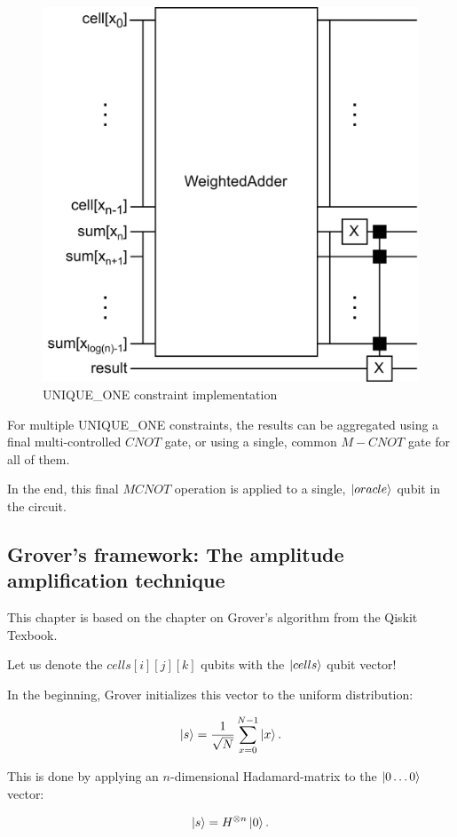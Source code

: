 \begin{figure}[H]
  \centering
    \includegraphics[width=0.7\linewidth]{content/assets/03_grovers_algorithm/unique_one.png}
    \caption{UNIQUE\_ONE constraint implementation}
\end{figure}

For multiple UNIQUE\_ONE constraints, the results can be aggregated using a final multi-controlled $CNOT$ gate, or using a single, common $M-CNOT$ gate for all of them.

In the end, this final $MCNOT$ operation is applied to a single, $\ket{oracle}$ qubit in the circuit.

\subsection{Grover's framework: The amplitude amplification technique}

This chapter is based on the chapter on Grover's algorithm from the Qiskit Texbook\cite{GroverQiskitTextbook}.

Let us denote the $cells[i][j][k]$ qubits with the $\ket{cells}$ qubit vector!

In the beginning, Grover initializes this vector to the uniform distribution:

\begin{align*}
\ket{s} = \frac{1}{\sqrt{N}}\sum\limits_{x=0}^{N-1}\ket{x}.
\end{align*}

This is done by applying an $n$-dimensional Hadamard-matrix to the $\ket{0\dots{}0}$ vector:

\begin{align*}
\ket{s} = H^{\otimes{}n}\ket{0}.
\end{align*}

